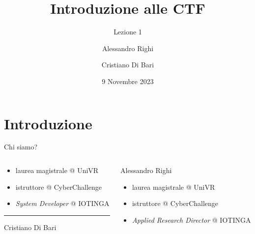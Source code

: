 \documentclass[12pt]{beamer}
\title{Introduzione alle CTF}
\subtitle{Lezione 1}
\author{Alessandro Righi \and Cristiano Di Bari}
\institute{Università degli Studi di Verona}
\date{9 Novembre 2023}
\begin{document}
\begin{frame}
\titlepage
\end{frame}

\section{Introduzione}

\begin{frame}{Chi siamo?}
\begin{columns}[T] %
\begin{column}{.48\textwidth}
\begin{itemize}
\item laurea magistrale @ UniVR
\item istruttore @ CyberChallenge
\item \textit{System Developer} @ IOTINGA
\end{itemize}        
{\color{blue}\rule{\linewidth}{2pt}}%
\begin{center}
Cristiano Di Bari
\end{center}
\end{column}%
\hfill%
\begin{column}{.48\textwidth}%
\begin{center}%

Alessandro Righi
\color{blue}{\rule{\linewidth}{2pt}}%
\begin{itemize}
\item laurea magistrale @ UniVR
\item istruttore @ CyberChallenge
\item \textit{Applied Research Director} @ IOTINGA
\end{itemize}
\end{center}
\end{column}%
\end{columns}
\end{frame}
\end{document}
